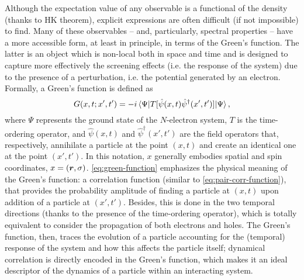 Although the expectation value of any observable is a functional of the density (thanks to HK theorem), explicit expressions are often difficult (if not impossible) to find. Many of these observables -- and, particularly, spectral properties -- have a more accessible form, at least in principle, in terms of the Green's function. The latter is an object which is non-local both in space and time and is designed to capture more effectively the screening effects (i.e. the response of the system) due to the presence of a perturbation, i.e. the potential generated by an electron. Formally, a Green's function is defined as
%
\begin{equation}
    G(x,t;x',t') = -i \braket{\Psi|T[\hat{\psi}(x,t) \hat{\psi}^{\dagger}(x',t')]|\Psi} ,
    \label{eq:green-function}
\end{equation}
%
where $\Psi$ represents the ground state of the $N$-electron system, $T$ is the time-ordering operator, and $\hat{\psi}(x,t)$ and $\hat{\psi}^{\dagger}(x',t')$ are the field operators that, respectively, annihilate a particle at the point $(x,t)$ and create an identical one at the point $(x',t')$. In this notation, $x$ generally embodies spatial and spin coordinates, $x=({\bm r},\sigma)$. \cref{eq:green-function} emphasizes the physical meaning of the Green's function: a correlation function (similar to \cref{eq:pair-corr-function}), that provides the probability amplitude of finding a particle at $(x,t)$ upon addition of a particle at $(x',t')$. Besides, this is done in the two temporal directions (thanks to the presence of the time-ordering operator), which is totally equivalent to consider the propagation of both electrons and holes. The Green's function, then, traces the evolution of a particle accounting for the (temporal) response of the system and how this affects the particle itself; dynamical correlation is directly encoded in the Green's function, which makes it an ideal descriptor of the dynamics of a particle within an interacting system.


